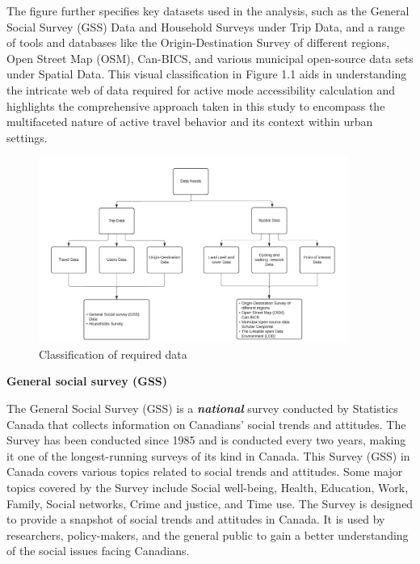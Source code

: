 \documentclass[12pt,twoside]{reedthesis}
\begin{document}
The figure further specifies key datasets used in the analysis, such as the General Social Survey (GSS) Data and Household Surveys under Trip Data, and a range of tools and databases like the Origin-Destination Survey of different regions, Open Street Map (OSM), Can-BICS, and various municipal open-source data sets under Spatial Data. This visual classification in Figure 1.1 aids in understanding the intricate web of data required for active mode accessibility calculation and highlights the comprehensive approach taken in this study to encompass the multifaceted nature of active travel behavior and its context within urban settings.
\begin{figure}
\centering
\includegraphics[width=0.9\textwidth,height=0.6\textheight]{images/Fig.1.jpg}
\caption{Classification of required data}
\end{figure}
\textbf{General social survey (GSS)}

The General Social Survey (GSS) is a \textbf{\emph{national}} survey conducted by Statistics Canada that collects information on Canadians' social trends and attitudes. The Survey has been conducted since 1985 and is conducted every two years, making it one of the longest-running surveys of its kind in Canada. This Survey (GSS) in Canada covers various topics related to social trends and attitudes. Some major topics covered by the Survey include Social well-being, Health, Education, Work, Family, Social networks, Crime and justice, and Time use. The Survey is designed to provide a snapshot of social trends and attitudes in Canada. It is used by researchers, policy-makers, and the general public to gain a better understanding of the social issues facing Canadians.
\end{document}
